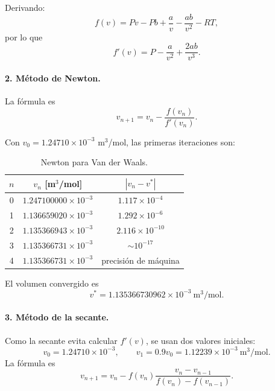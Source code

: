 \documentclass[11pt,a4paper]{article}
\begin{document}
Derivando:
\[
f(v)=Pv-Pb+\frac{a}{v}-\frac{ab}{v^2}-RT,
\]
por lo que
\begin{equation}
\boxed{f'(v)=P-\frac{a}{v^2}+\frac{2ab}{v^3}.}
\end{equation}

\paragraph{2. Método de Newton.}

La fórmula es
\begin{equation}
\boxed{v_{n+1}=v_n-\frac{f(v_n)}{f'(v_n)}.}
\end{equation}

Con $v_0=1.24710\times10^{-3}$ m$^3$/mol, las primeras iteraciones son:
\begin{table}[H]
\centering
\caption{Newton para Van der Waals.}
\begin{tabular}{c|cc}
\toprule
$n$ & $v_n$ [m$^3$/mol] & $|v_n-v^*|$\\
\midrule
0&$1.247100000\times10^{-3}$&$1.117\times10^{-4}$\\
1&$1.136659020\times10^{-3}$&$1.292\times10^{-6}$\\
2&$1.135366943\times10^{-3}$&$2.116\times10^{-10}$\\
3&$1.135366731\times10^{-3}$&$\sim10^{-17}$\\
4&$1.135366731\times10^{-3}$&precisión de máquina\\
\bottomrule
\end{tabular}
\end{table}

El volumen convergido es
\begin{equation}
\boxed{v^*=1.135366730962\times10^{-3}\ \mathrm{m^3/mol}.}
\end{equation}

\paragraph{3. Método de la secante.}

Como la secante evita calcular $f'(v)$, se usan dos valores iniciales:
\[
v_0=1.24710\times10^{-3},
\qquad
v_1=0.9v_0=1.12239\times10^{-3}\ \mathrm{m^3/mol}.
\]
La fórmula es
\begin{equation}
\boxed{
 v_{n+1}=v_n-f(v_n)\frac{v_n-v_{n-1}}{f(v_n)-f(v_{n-1})}.}
\end{equation}
\end{document}
